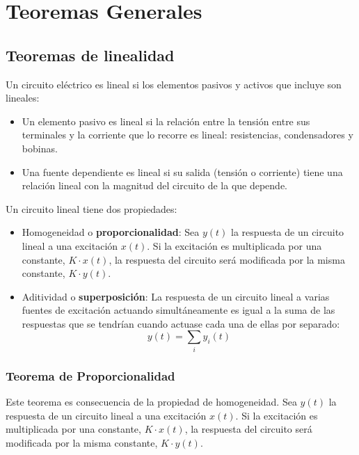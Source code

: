 \chapter{Teoremas Generales}\label{chap:teoremas}
	
\section{Teoremas de linealidad}
	
Un circuito eléctrico es lineal si los elementos pasivos y activos que
incluye son lineales:
\begin{itemize}
\item Un elemento pasivo es lineal si la relación entre la tensión
  entre sus terminales y la corriente que lo recorre es lineal:
  resistencias, condensadores y bobinas.
\item Una fuente dependiente es lineal si su salida (tensión o
  corriente) tiene una relación lineal con la magnitud del circuito de
  la que depende.
\end{itemize}
Un circuito lineal tiene dos propiedades:
\begin{itemize}
\item Homogeneidad o \textbf{proporcionalidad}: Sea $y(t)$ la
  respuesta de un circuito lineal a una excitación $x(t)$. Si la
  excitación es multiplicada por una constante, $K\cdot x(t)$, la
  respuesta del circuito será modificada por la misma constante,
  $K \cdot y(t)$.
\item Aditividad o \textbf{superposición}: La respuesta de un circuito
  lineal a varias fuentes de excitación actuando simultáneamente es
  igual a la suma de las respuestas que se tendrían cuando actuase
  cada una de ellas por separado:
  \begin{equation*}
    y(t)=\sum_i y_i(t)
  \end{equation*}
\end{itemize}

\subsection{Teorema de Proporcionalidad}
\label{sec:proporcionalidad}

Este teorema es consecuencia de la propiedad de homogeneidad. Sea $y(t)$ la respuesta de un circuito lineal a una excitación $x(t)$.  Si la excitación es multiplicada por una constante, $K \cdot x(t)$, la respuesta del circuito será modificada por la misma constante, $K \cdot y(t)$.

